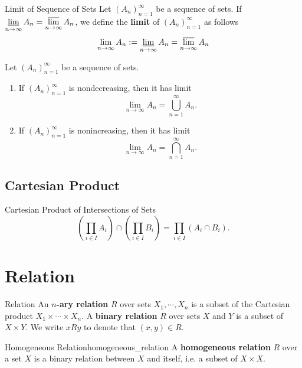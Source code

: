 \begin{definition}{Limit of Sequence of Sets}{}
	Let $\left(A_n\right)_{n=1}^{\infty}$ be a sequence of sets. If 
	$\operatorname*{\underline{lim}}\limits_{n\to\infty}A_n=\operatorname*{\overline{lim}}\limits_{n\to\infty}A_n$, we define the \textbf{limit} of $\left(A_n\right)_{n=1}^{\infty}$ as follows 
	\[
		\lim\limits_{n\to\infty}A_n:=\operatorname*{\underline{lim}}\limits_{n\to\infty}A_n=\operatorname*{\overline{lim}}\limits_{n\to\infty}A_n
	\]
\end{definition}

\begin{proposition}{}{}
	Let $\left(A_n\right)_{n=1}^{\infty}$ be a sequence of sets.
	\begin{enumerate}
		\item If $\left(A_n\right)_{n=1}^{\infty}$ is nondecreasing, then it has limit
		\[
			\lim\limits_{n\to\infty}A_n=\bigcup_{n=1}^\infty A_n.
		\]
		\item If $\left(A_n\right)_{n=1}^{\infty}$ is nonincreasing, then it has limit
		\[
			\lim\limits_{n\to\infty}A_n=\bigcap_{n=1}^\infty A_n.
		\]
	\end{enumerate}
\end{proposition}


\subsection{Cartesian Product}

\begin{proposition}{Cartesian Product of Intersections of Sets}{}
    \[
    \left(\prod_{i \in I} A_i\right) \cap \left(\prod_{i \in I} B_i\right) = \prod_{i \in I} \left(A_i \cap B_i\right).
    \]
\end{proposition}


\section{Relation}
\begin{definition}{Relation}{}
    An \textbf{$n$-ary relation} $R$ over sets $X_1, \cdots, X_n$ is a subset of the Cartesian product $X_1 \times \cdots \times X_n$. A \textbf{binary relation} $R$ over sets $X$ and $Y$ is a subset of $X \times Y$. We write $xRy$ to denote that $(x, y) \in R$.
\end{definition}

\begin{definition}{Homogeneous Relation}{homogeneous_relation}
    A \textbf{homogeneous relation} $R$ over a set $X$ is a binary relation between $X$ and itself, i.e. a subset of $X \times X$. 
\end{definition}

